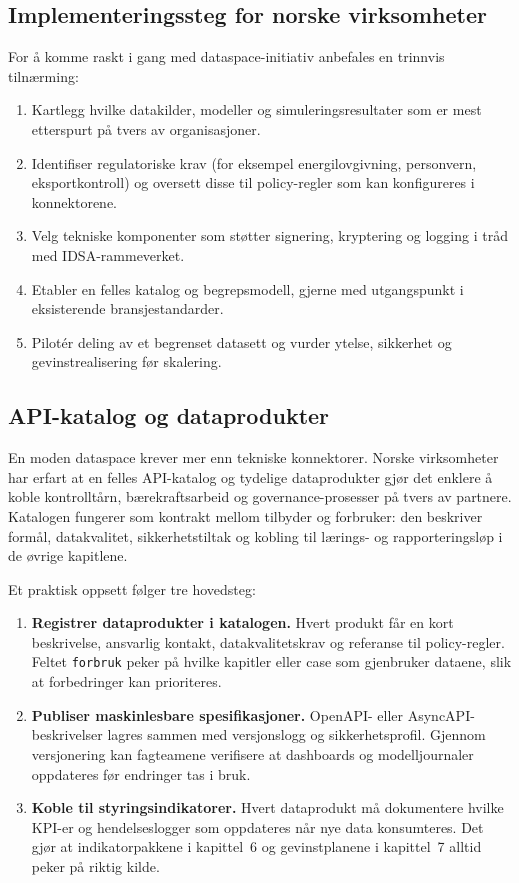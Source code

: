 \subsection{Implementeringssteg for norske virksomheter}
For å komme raskt i gang med dataspace-initiativ anbefales en trinnvis tilnærming:
\begin{enumerate}
    \item Kartlegg hvilke datakilder, modeller og simuleringsresultater som er mest etterspurt på tvers av organisasjoner.
    \item Identifiser regulatoriske krav (for eksempel energilovgivning, personvern, eksportkontroll) og oversett disse til
    policy-regler som kan konfigureres i konnektorene.
    \item Velg tekniske komponenter som støtter signering, kryptering og logging i tråd med IDSA-rammeverket.
    \item Etabler en felles katalog og begrepsmodell, gjerne med utgangspunkt i eksisterende bransjestandarder.
    \item Pilotér deling av et begrenset datasett og vurder ytelse, sikkerhet og gevinstrealisering før skalering.
\end{enumerate}
\subsection{API-katalog og dataprodukter}
En moden dataspace krever mer enn tekniske konnektorer. Norske virksomheter har erfart at en felles API-katalog og tydelige
dataprodukter gjør det enklere å koble kontrolltårn, bærekraftsarbeid og governance-prosesser på tvers av partnere.\citep{digdir2023apiveileder,dssc2024dataproducts}
Katalogen fungerer som kontrakt mellom tilbyder og forbruker: den beskriver formål, datakvalitet, sikkerhetstiltak og kobling
til lærings- og rapporteringsløp i de øvrige kapitlene.

Et praktisk oppsett følger tre hovedsteg:
\begin{enumerate}
    \item \textbf{Registrer dataprodukter i katalogen.} Hvert produkt får en kort beskrivelse, ansvarlig kontakt, datakvalitetskrav
    og referanse til policy-regler. Feltet \texttt{forbruk} peker på hvilke kapitler eller case som gjenbruker dataene, slik at
    forbedringer kan prioriteres.
    \item \textbf{Publiser maskinlesbare spesifikasjoner.} OpenAPI- eller AsyncAPI-beskrivelser lagres sammen med versjonslogg og
    sikkerhetsprofil. Gjennom versjonering kan fagteamene verifisere at dashboards og modelljournaler oppdateres før endringer
    tas i bruk.
    \item \textbf{Koble til styringsindikatorer.} Hvert dataprodukt må dokumentere hvilke KPI-er og hendelseslogger som oppdateres
    når nye data konsumteres. Det gjør at indikatorpakkene i kapittel~6 og gevinstplanene i kapittel~7 alltid peker på riktig
    kilde.
\end{enumerate}

